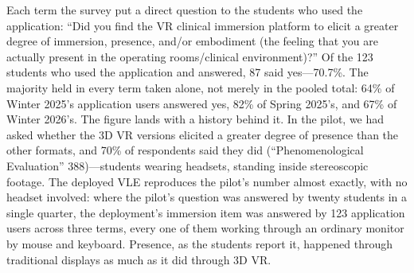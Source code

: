 
Each term the survey put a direct question to the students who used the
application: ``Did you find the VR clinical immersion platform to elicit a
greater degree of immersion, presence, and/or embodiment (the feeling that
you are actually present in the operating rooms/clinical environment)?''
Of the 123 students who used the application and answered, 87 said
yes---70.7\%. The majority held in every term taken alone, not merely in
the pooled total: 64\% of Winter 2025's application users answered yes,
82\% of Spring 2025's, and 67\% of Winter 2026's. The figure lands with a
history behind it. In the pilot, we had asked whether the 3D VR versions
elicited a greater degree of presence than the other formats, and 70\% of
respondents said they did (``Phenomenological Evaluation''
388)---students wearing headsets, standing inside stereoscopic footage.
The deployed VLE reproduces the pilot's number almost exactly, with no
headset involved: where the pilot's question was answered by twenty
students in a single quarter, the deployment's immersion item was answered
by 123 application users across three terms, every one of them working
through an ordinary monitor by mouse and keyboard. Presence, as the
students report it, happened through traditional displays as much as it
did through 3D VR.

